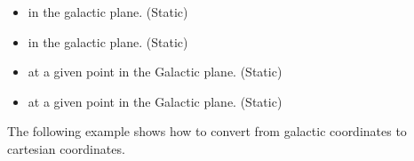 \documentclass[letterpaper,10pt,english]{sphinxmanual}
\begin{document}
\begin{fulllineitems}
\begin{description}
\begin{itemize}
\begin{description}
\end{description}

\item {} \begin{description}
\sphinxAtStartPar
in the galactic plane. (Static)

\end{description}

\item {} \begin{description}
\sphinxAtStartPar
in the galactic plane. (Static)

\end{description}

\item {} \begin{description}
\sphinxAtStartPar
at a given point in the Galactic plane. (Static)

\end{description}

\item {} \begin{description}
\sphinxAtStartPar
at a given point in the Galactic plane. (Static)

\end{description}

\end{itemize}

\sphinxAtStartPar
The following example shows how to convert from galactic coordinates to cartesian coordinates.

\begin{sphinxVerbatim}[commandchars=\\\{\}]
      
\end{sphinxVerbatim}


\end{description}
\end{fulllineitems}
\end{document}
